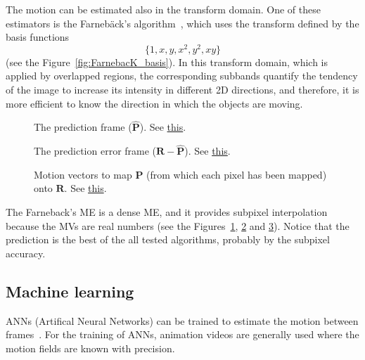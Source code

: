 The motion can be estimated also in the transform domain. One of these
estimators is the Farneb{\"a}ck's algorithm~\cite{farneback2003two},
which uses the transform defined by the basis functions
\begin{equation}
    \{1, x, y, x^2, y^2, xy\}
\end{equation}
(see the Figure~\ref{fig:FarnebacK_basis}). In this transform domain,
which is applied by overlapped regions, the corresponding subbands
quantify the tendency of the image to increase its intensity in
different 2D directions, and therefore, it is more efficient to know
the direction in which the objects are moving.

\begin{figure}
  \centering
  \caption{The prediction frame (${\hat{\mathbf P}}$). See \href{https://github.com/Sistemas-Multimedia/Sistemas-Multimedia.github.io/blob/master/milestones/10-ME/farneback_ME.ipynb}{this}.}
  \label{fig:hat_P_farneback}
\end{figure}

\begin{figure}
  \centering
  \caption{The prediction error frame (${\mathbf R} - {\hat{\mathbf P}}$). See \href{https://github.com/Sistemas-Multimedia/Sistemas-Multimedia.github.io/blob/master/milestones/10-ME/farneback_ME.ipynb}{this}.}
  \label{fig:error_farneback}
\end{figure}

\begin{figure}
  \centering
  \caption{Motion vectors to map ${\mathbf P}$ (from which each pixel has been mapped) onto ${\mathbf R}$. See \href{https://github.com/Sistemas-Multimedia/Sistemas-Multimedia.github.io/blob/master/milestones/10-ME/farneback_ME.ipynb}{this}.}
  \label{fig:MVs_farneback}
\end{figure}

The Farneback's ME is a dense ME, and it provides subpixel
interpolation because the MVs are real numbers (see the
Figures~\ref{fig:hat_P_farneback}, \ref{fig:error_farneback} and
\ref{fig:MVs_farneback}). Notice that the prediction is the best of
the all tested algorithms, probably by the subpixel accuracy.

\subsection{Machine learning}
ANNs (Artifical Neural Networks) can be trained to estimate the motion
between frames~\cite{dosovitskiy2015flownet}. For the training of
ANNs, animation videos are generally used where the motion fields are
known with precision.


